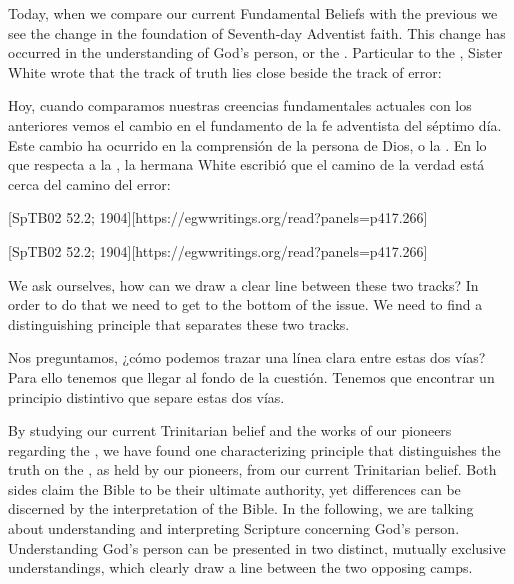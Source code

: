 



Today, when we compare our current Fundamental Beliefs with the previous  we see the change in the foundation of Seventh-day Adventist faith. This change has occurred in the understanding of God’s person, or the . Particular to the , Sister White wrote that the track of truth lies close beside the track of error:


Hoy, cuando comparamos nuestras creencias fundamentales actuales con los anteriores  vemos el cambio en el fundamento de la fe adventista del séptimo día. Este cambio ha ocurrido en la comprensión de la persona de Dios, o la . En lo que respecta a la , la hermana White escribió que el camino de la verdad está cerca del camino del error:


[SpTB02 52.2; 1904][https://egwwritings.org/read?panels=p417.266]


[SpTB02 52.2; 1904][https://egwwritings.org/read?panels=p417.266]


We ask ourselves, how can we draw a clear line between these two tracks? In order to do that we need to get to the bottom of the issue. We need to find a distinguishing principle that separates these two tracks.


Nos preguntamos, ¿cómo podemos trazar una línea clara entre estas dos vías? Para ello tenemos que llegar al fondo de la cuestión. Tenemos que encontrar un principio distintivo que separe estas dos vías.


By studying our current Trinitarian belief and the works of our pioneers regarding the , we have found one characterizing principle that distinguishes the truth on the , as held by our pioneers, from our current Trinitarian belief. Both sides claim the Bible to be their ultimate authority, yet differences can be discerned by the interpretation of the Bible. In the following, we are talking about understanding and interpreting Scripture concerning God’s person. Understanding God’s person can be presented in two distinct, mutually exclusive understandings, which clearly draw a line between the two opposing camps.



